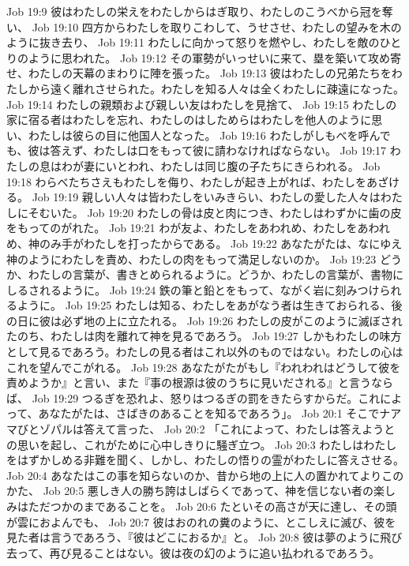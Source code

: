 Job 19:9  彼はわたしの栄えをわたしからはぎ取り、わたしのこうべから冠を奪い、
Job 19:10  四方からわたしを取りこわして、うせさせ、わたしの望みを木のように抜き去り、
Job 19:11  わたしに向かって怒りを燃やし、わたしを敵のひとりのように思われた。
Job 19:12  その軍勢がいっせいに来て、塁を築いて攻め寄せ、わたしの天幕のまわりに陣を張った。
Job 19:13  彼はわたしの兄弟たちをわたしから遠く離れさせられた。わたしを知る人々は全くわたしに疎遠になった。
Job 19:14  わたしの親類および親しい友はわたしを見捨て、
Job 19:15  わたしの家に宿る者はわたしを忘れ、わたしのはしためらはわたしを他人のように思い、わたしは彼らの目に他国人となった。
Job 19:16  わたしがしもべを呼んでも、彼は答えず、わたしは口をもって彼に請わなければならない。
Job 19:17  わたしの息はわが妻にいとわれ、わたしは同じ腹の子たちにきらわれる。
Job 19:18  わらべたちさえもわたしを侮り、わたしが起き上がれば、わたしをあざける。
Job 19:19  親しい人々は皆わたしをいみきらい、わたしの愛した人々はわたしにそむいた。
Job 19:20  わたしの骨は皮と肉につき、わたしはわずかに歯の皮をもってのがれた。
Job 19:21  わが友よ、わたしをあわれめ、わたしをあわれめ、神のみ手がわたしを打ったからである。
Job 19:22  あなたがたは、なにゆえ神のようにわたしを責め、わたしの肉をもって満足しないのか。
Job 19:23  どうか、わたしの言葉が、書きとめられるように。どうか、わたしの言葉が、書物にしるされるように。
Job 19:24  鉄の筆と鉛とをもって、ながく岩に刻みつけられるように。
Job 19:25  わたしは知る、わたしをあがなう者は生きておられる、後の日に彼は必ず地の上に立たれる。
Job 19:26  わたしの皮がこのように滅ぼされたのち、わたしは肉を離れて神を見るであろう。
Job 19:27  しかもわたしの味方として見るであろう。わたしの見る者はこれ以外のものではない。わたしの心はこれを望んでこがれる。
Job 19:28  あなたがたがもし『われわれはどうして彼を責めようか』と言い、また『事の根源は彼のうちに見いだされる』と言うならば、
Job 19:29  つるぎを恐れよ、怒りはつるぎの罰をきたらすからだ。これによって、あなたがたは、さばきのあることを知るであろう」。
Job 20:1  そこでナアマびとゾパルは答えて言った、
Job 20:2  「これによって、わたしは答えようとの思いを起し、これがために心中しきりに騒ぎ立つ。
Job 20:3  わたしはわたしをはずかしめる非難を聞く、しかし、わたしの悟りの霊がわたしに答えさせる。
Job 20:4  あなたはこの事を知らないのか、昔から地の上に人の置かれてよりこのかた、
Job 20:5  悪しき人の勝ち誇はしばらくであって、神を信じない者の楽しみはただつかのまであることを。
Job 20:6  たといその高さが天に達し、その頭が雲におよんでも、
Job 20:7  彼はおのれの糞のように、とこしえに滅び、彼を見た者は言うであろう、『彼はどこにおるか』と。
Job 20:8  彼は夢のように飛び去って、再び見ることはない。彼は夜の幻のように追い払われるであろう。
